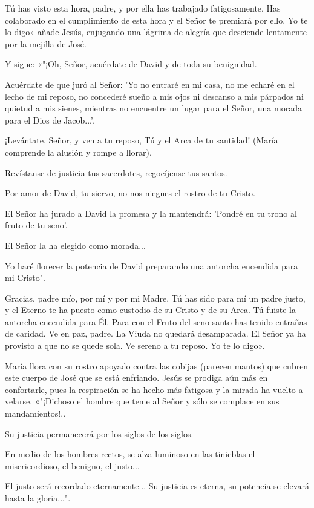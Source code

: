 \documentclass[12pt, twoside, openright]{book} %
\begin{document}
Tú has visto esta hora, padre, y por ella has trabajado fatigosamente. Has colaborado en el cumplimiento de esta hora y el Señor te premiará por ello. Yo te lo digo» añade Jesús, enjugando una lágrima de alegría que desciende lentamente por la mejilla de José. 

Y sigue: «"¡Oh, Señor, acuérdate de David y de toda su benignidad. 

Acuérdate de que juró al Señor: 'Yo no entraré en mi casa, no me echaré en el lecho de mi reposo, no concederé sueño a mis ojos ni descanso a mis párpados ni quietud a mis sienes, mientras no encuentre un lugar para el Señor, una morada para el Dios de Jacob...'. 

¡Levántate, Señor, y ven a tu reposo, Tú y el Arca de tu santidad! (María comprende la alusión y rompe a llorar). 

Revístanse de justicia tus sacerdotes, regocíjense tus santos. 

Por amor de David, tu siervo, no nos niegues el rostro de tu Cristo. 

El Señor ha jurado a David la promesa y la mantendrá: 'Pondré en tu trono al fruto de tu seno'. 

El Señor la ha elegido como morada... 

Yo haré florecer la potencia de David preparando una antorcha encendida para mi Cristo". 

Gracias, padre mío, por mí y por mi Madre. Tú has sido para mí un padre justo, y el Eterno te ha puesto como custodio de su Cristo y de su Arca. Tú fuiste la antorcha encendida para Él. Para con el Fruto del seno santo has tenido entrañas de caridad. Ve en paz, padre. La Viuda no quedará desamparada. El Señor ya ha provisto a que no se quede sola. Ve sereno a tu reposo. Yo te lo digo». 

María llora con su rostro apoyado contra las cobijas (parecen mantos) que cubren este cuerpo de José que se está enfriando. Jesús se prodiga aún más en confortarle, pues la respiración se ha hecho más fatigosa y la mirada ha vuelto a velarse. «"¡Dichoso el hombre que teme al Señor y sólo se complace en sus mandamientos!.. 

Su justicia permanecerá por los siglos de los siglos. 

En medio de los hombres rectos, se alza luminoso en las tinieblas el misericordioso, el benigno, el justo... 

El justo será recordado eternamente... Su justicia es eterna, su potencia se elevará hasta la gloria...". 
\end{document}
